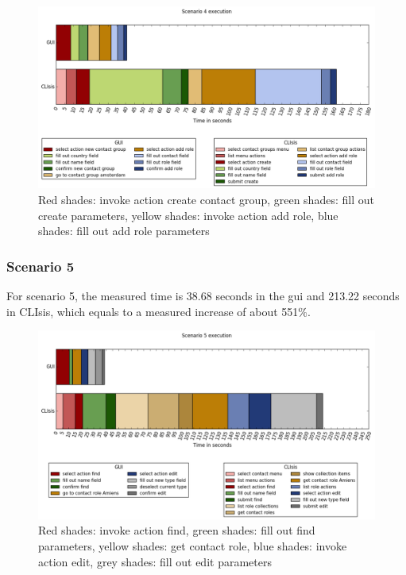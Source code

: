\begin{figure}[H]
	\center
	\includegraphics[width=\textwidth]{figures/scenario4}
	\caption{Red shades: invoke action create contact group, green shades: fill out create parameters, yellow shades: invoke action add role, blue shades: fill out add role parameters}
	\label{figure:scenario4timetrial}
\end{figure}

\subsubsection{Scenario 5}
For scenario 5, the measured time is 38.68 seconds in the \acrshort{gui} and 213.22 seconds in CLIsis, which equals to a measured increase of about 551\%.

\begin{figure}[H]
	\center
	\includegraphics[width=\textwidth]{figures/scenario5}
	\caption{Red shades: invoke action find, green shades: fill out find parameters, yellow shades: get contact role, blue shades: invoke action edit, grey shades: fill out edit parameters}
	\label{figure:scenario5timetrial}
\end{figure}

